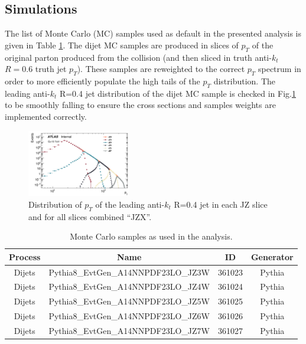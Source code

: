 \subsection{Simulations}

The list of Monte Carlo (MC) samples used as default in the presented analysis is given in Table \ref{tab:mc_samples1}. The dijet MC samples are produced in slices of $p_{T}$ of the original parton produced from the collision (and then sliced in truth anti-$k_t$ $R=0.6$ truth jet $p_T$).  These samples are reweighted to the correct $p_{T}$ spectrum in order to more efficiently populate the high tails of the $p_{T}$ distribution. The leading anti-$k_t$ R=0.4 jet distribution of the dijet MC sample is checked in Fig.\ref{fig:gbb-leadAkt4} to be smoothly falling to ensure the cross sections and samples weights are implemented correctly.

\begin{figure}[htbp]
  \centering
 \includegraphics[width=0.4\textwidth]{figures/gbb/LeadJetCheck.png}
\caption{Distribution of $p_T$ of the leading anti-$k_t$ R=0.4 jet in each JZ slice and for all slices combined ``JZX''.}
  \label{fig:gbb-leadAkt4}
\end{figure}


\begin{table}[htpb]
\centering
\begin{tabular}{cccc}
Process & Name & ID & Generator \\
\hline 
\hline
Dijets & Pythia8\_EvtGen\_A14NNPDF23LO\_JZ3W & 361023 & Pythia  \\
Dijets & Pythia8\_EvtGen\_A14NNPDF23LO\_JZ4W & 361024 & Pythia  \\
Dijets & Pythia8\_EvtGen\_A14NNPDF23LO\_JZ5W & 361025 & Pythia  \\
Dijets & Pythia8\_EvtGen\_A14NNPDF23LO\_JZ6W & 361026 & Pythia  \\
Dijets & Pythia8\_EvtGen\_A14NNPDF23LO\_JZ7W & 361027 & Pythia  \\
\hline
\hline
\end{tabular}
\caption{Monte Carlo samples as used in the analysis. }
\label{tab:mc_samples1}
\end{table}


